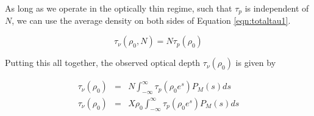 As long as we operate in the optically thin regime, such that $\tau_p$ is independent of $N$,
we can use the average density on both sides of Equation \ref{eqn:totaltau1}.

\begin{equation}
    \label{eqn:totaltau2}
    \tau_\nu(\rho_0,N) = N \tau_p(\rho_0)
\end{equation}

Putting this all together, the observed optical depth $\tau_\nu(\rho_0)$ is given by

\begin{eqnarray}
    \tau_\nu(\rho_0) & = & N \int_{-\infty}^\infty \tau_p(\rho_0 e^s) P_M(s) d s \\
    \tau_\nu(\rho_0) & = & X \rho_0 \int_{-\infty}^\infty \tau_p(\rho_0 e^s) P_M(s) d s 
\end{eqnarray}


